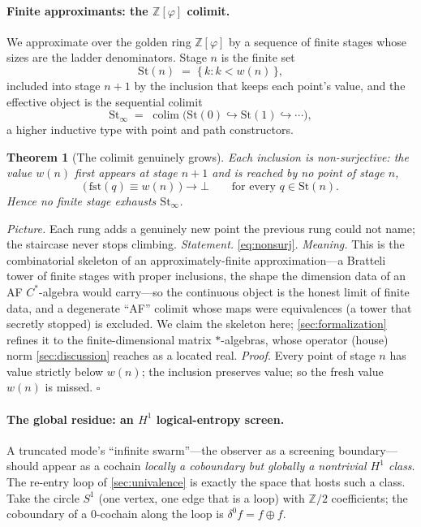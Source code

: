 \documentclass[11pt,letterpaper]{article}
\theoremstyle{plain}
\newtheorem{theorem}{Theorem}[section]
\theoremstyle{definition}
\theoremstyle{remark}
\newcommand{\ZZ}{\mathbb{Z}}
\newcommand{\Zphi}{\ZZ[\varphi]}
\newcommand{\bbtwo}{\mathbb{Z}/2}
\DeclareMathOperator{\colim}{colim}
\begin{document}
\paragraph{Finite approximants: the $\Zphi$ colimit.}
We approximate over the golden ring $\Zphi$ by a
sequence of finite stages whose sizes are the ladder denominators. Stage $n$ is
the finite set
\begin{equation}\label{eq:af-stage}
  \mathrm{St}(n) \;=\; \{\,k : k < w(n)\,\},
\end{equation}
included into stage $n{+}1$ by the inclusion that keeps each point's value, and the
effective object is the sequential colimit
\begin{equation}\label{eq:af-colim}
  \mathrm{St}_\infty \;=\; \colim\big(\mathrm{St}(0)\hookrightarrow
  \mathrm{St}(1)\hookrightarrow\cdots\big),
\end{equation}
a higher inductive type with point and path constructors.

\begin{theorem}[The colimit genuinely grows]\label{thm:af}
Each inclusion is non-surjective: the value $w(n)$ first appears at stage $n{+}1$
and is reached by no point of stage $n$,
\begin{equation}\label{eq:nonsurj}
  \big(\,\mathrm{fst}(q) \equiv w(n)\,\big)\to\bot
  \qquad\text{for every } q\in\mathrm{St}(n).
\end{equation}
Hence no finite stage exhausts $\mathrm{St}_\infty$.
\end{theorem}

\noindent\emph{Picture.} Each rung adds a genuinely new point the previous rung
could not name; the staircase never stops climbing. \emph{Statement.}
\cref{eq:nonsurj}. \emph{Meaning.} This is the combinatorial skeleton of an
approximately-finite approximation---a Bratteli tower of finite stages with proper
inclusions, the shape the dimension data of an AF $C^\ast$-algebra would carry---so
the continuous object is the honest limit of finite data, and a degenerate ``AF''
colimit whose maps were equivalences (a tower that secretly stopped) is excluded.
We claim the skeleton here; \cref{sec:formalization} refines it to the
finite-dimensional matrix $\ast$-algebras, whose operator (house) norm
\cref{sec:discussion} reaches as a located real. \emph{Proof.} Every point of stage $n$ has value strictly
below $w(n)$; the inclusion preserves value; so the fresh value $w(n)$ is missed.
\hfill$\square$

\paragraph{The global residue: an $H^1$ logical-entropy screen.}
A truncated mode's ``infinite swarm''---the observer as a screening
boundary---should appear as a cochain \emph{locally a
coboundary but globally a nontrivial $H^1$ class}. The re-entry loop of
\cref{sec:univalence} is exactly the space that hosts such a class. Take the
circle $S^1$ (one vertex, one edge that is a loop) with $\bbtwo$ coefficients; the
coboundary of a $0$-cochain along the loop is $\delta^0 f = f\oplus f$.
\end{document}
